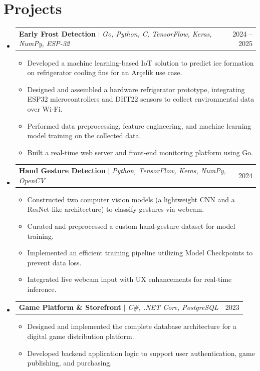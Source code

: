 \documentclass[letterpaper,11pt]{article}
\makeatletter
\newcommand{\resumeItem}[1]{
  \item\small{
    {#1 \vspace{-2pt}}
  }
}
\newcommand{\resumeProjectHeading}[2]{
    \item
    \begin{tabular*}{0.97\textwidth}{l@{\extracolsep{\fill}}r}
      \small#1 & #2 \\
    \end{tabular*}\vspace{-7pt}
}
\newcommand{\resumeSubHeadingListStart}{\begin{itemize}[leftmargin=0.15in, label={}]}
\newcommand{\resumeSubHeadingListEnd}{\end{itemize}}
\newcommand{\resumeItemListStart}{\begin{itemize}}
\newcommand{\resumeItemListEnd}{\end{itemize}\vspace{-5pt}}
\makeatother
\begin{document}
\section{Projects}
    \resumeSubHeadingListStart
      \resumeProjectHeading
          {\textbf{Early Frost Detection} $|$ \emph{Go, Python, C, TensorFlow, Keras, NumPy, ESP-32}}{2024 -- 2025}
          \resumeItemListStart
            \resumeItem{Developed a machine learning-based IoT solution to predict ice formation on refrigerator cooling fins for an Arçelik use case.}
            \resumeItem{Designed and assembled a hardware refrigerator prototype, integrating ESP32 microcontrollers and DHT22 sensors to collect environmental data over Wi-Fi.}
            \resumeItem{Performed data preprocessing, feature engineering, and machine learning model training on the collected data.}
            \resumeItem{Built a real-time web server and front-end monitoring platform using Go.}
          \resumeItemListEnd
      \resumeProjectHeading
          {\textbf{Hand Gesture Detection} $|$ \emph{Python, TensorFlow, Keras, NumPy, OpenCV}}{2024}
          \resumeItemListStart
            \resumeItem{Constructed two computer vision models (a lightweight CNN and a ResNet-like architecture) to classify gestures via webcam.}
            \resumeItem{Curated and preprocessed a custom hand-gesture dataset for model training.}
            \resumeItem{Implemented an efficient training pipeline utilizing Model Checkpoints to prevent data loss.}
            \resumeItem{Integrated live webcam input with UX enhancements for real-time inference.}
          \resumeItemListEnd
      \resumeProjectHeading
          {\textbf{Game Platform \& Storefront} $|$ \emph{C\#, .NET Core, PostgreSQL}}{2023}
          \resumeItemListStart
            \resumeItem{Designed and implemented the complete database architecture for a digital game distribution platform.}
            \resumeItem{Developed backend application logic to support user authentication, game publishing, and purchasing.}
          \resumeItemListEnd
    \resumeSubHeadingListEnd
\end{document}
